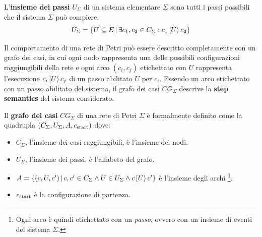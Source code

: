 \begin{defn}
    L'\textbf{insieme dei passi} $U_{\Sigma}$ di un sistema elementare $\Sigma$
    sono tutti i passi possibili che il sistema $\Sigma$ può compiere.
    \[
        U_{\Sigma} = \left\{U \subseteq E \, | \,
        \exists c_1, c_2 \in C_{\Sigma} : c_1\,[U\rangle\,c_2\right\}
    \]
\end{defn}

Il comportamento di una rete di Petri
può essere descritto completamente con un grafo dei casi, in cui ogni nodo
rappresenta una delle possibili configurazioni raggiungibili della rete
e ogni arco $(c_i, c_j)$ etichettato con $U$ rappresenta l'esecuzione
$c_i\,[U\rangle\,c_j$ di un passo abilitato $U$ per $c_i$.
Essendo un arco etichettato con un passo abilitato del sistema, il grafo
dei casi $CG_{\Sigma}$ descrive la \textbf{step semantics} del sistema
considerato.

\begin{defn}
    Il \textbf{grafo dei casi} $CG_{\Sigma}$ di una rete di Petri $\Sigma$ è
    formalmente definito come la quadrupla
    $(C_{\Sigma}, U_{\Sigma}, A, c_{\textnormal{start}})$ dove:
    \begin{itemize}
        \item $C_{\Sigma}$, l'insieme dei casi raggiungibili, è l'insieme
        dei nodi.
        \item $U_{\Sigma}$, l'insieme dei passi, è l'alfabeto del grafo.
        \item $A = \left\{(c, U, c') \, | \, c, c' \in C_{\Sigma} \land
        U \in U_{\Sigma} \land c\,[U\rangle\,c'\right\}$
        è l'insieme degli archi
        \footnote{Ogni arco è quindi etichettato con un \textit{passo},
        ovvero con un insieme di eventi del sistema $\Sigma$.}.
        \item $c_{\textnormal{start}}$ è la configurazione di partenza.
    \end{itemize}
\end{defn}

